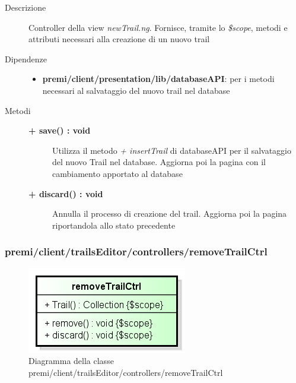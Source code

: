 \begin{description}
\item[Descrizione] \hfill
	Controller della view \textit{newTrail.ng}. Fornisce, tramite lo \textit{\$scope}, metodi e attributi necessari alla creazione di un nuovo trail
	
	
\item[Dipendenze] \hfill
	\begin{itemize}
		\item \textbf{premi/client/presentation/lib/databaseAPI}: per i metodi necessari al salvataggio del nuovo trail nel database
	\end{itemize}
	
	
\item[Metodi] \hfill

	\begin{description}
		\item[\textbf{\color{blue}+ save() : void			}] \hfill
			Utilizza il metodo \textit{+ insertTrail} di databaseAPI per il salvataggio del nuovo Trail nel database. Aggiorna poi la pagina con il cambiamento apportato al database
	\end{description}
	
	\begin{description}
		\item[\textbf{\color{blue}+ discard() : void			}] \hfill
			Annulla il processo di creazione del trail. Aggiorna poi la pagina riportandola allo stato precedente
	\end{description}

\end{description}
	






\subsubsection{premi/client/trailsEditor/controllers/removeTrailCtrl}
\begin{figure}[H]
\begin{center}
\includegraphics[scale=0.95]{img/diacla/removeTrailCtrl.png}
\caption{Diagramma della classe premi/client/trailsEditor/controllers/removeTrailCtrl}
\end{center}
\end{figure}


